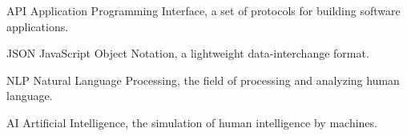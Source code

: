 \begin{denotation}[3cm]
\item[API]{Application Programming Interface, a set of protocols for building software applications.}

\item[JSON]{JavaScript Object Notation, a lightweight data-interchange format.}

\item[NLP]{Natural Language Processing, the field of processing and analyzing human language.}

\item[AI]{Artificial Intelligence, the simulation of human intelligence by machines.}

\end{denotation}
